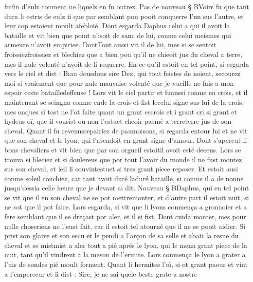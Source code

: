 \documentclass{article}
\begin{document}
\begin{pages}
      finfin d'eulz conment ne liquelz 
      en fu outrez. \pend
\pstart Pas de nouveau § BVoirs fu que tant dura li estris de eulz ii 
   que par semblant pou pooit conquerre l’un sus l’autre, et leur cop estoient moult afebloié. Dont esgarda 
   Daphus celui a qui il avoit la bataille et vit bien
   que point n’isoit de sanc de lui, conme celui meismes qui armeure n’avoit empiriee. 
   DontTout aussi vit il de lui, mes si se sentoit 
   froissiezfroissiez et blechiez que a bien pou qu’il ne chieoit jus du cheval a 
   terre, mes il nule volenté n’avoit de li requerre. En ce qu’il estoit en tel point, 
   si esgarda vers le ciel et dist :
   Biau 
      dousdous sire Dex, qui tout feistes de noient, 
      secourez moi si vraiement que pour nule mauvaise volenté que je vueille ne fais a mon espoir ceste 
      batailledeffense !
   Lors vit le ciel partir et fuaussi conme en crois, 
   et il maintenant se seingna conme ende la crois
       et fist lecelui signe sus lui 
   de la crois, mes onques si tost ne l’ot faite quant un grant escrois et 
   i grant cri si grant et hydeus oï, que il vousist ou non l’estuet 
   cheoir pasmé a terreterre jus de son cheval. \pend
\pstart Quant il fu revenusrepairiez de paumoisons, 
   si regarda entour lui et ne vit que son cheval et le lyon, qui l’atendoit en 
   grant signe d’amour. Dont s’apercut li bons chevaliers et vit bien que par son 
   orgueil estoitil avoit esté deceus. 
   Lors se trouva si bleciez et si doulereus que por tout l’avoir du monde il ne fust montez sus son cheval, et 
   leil li couvintestuet 
   si tres grant piece reposer. Et estoit ausi conme soleil couchiez, car tant avoit 
   duré laduré bataille, 
   si conme il a de nonne jusqu’dessia celle heure que 
   je devant ai dit. 
   Nouveau § BDaphus, qui en tel point se vit que il en son cheval ne 
   se pot mettremonter, 
   et d’autre part il estoit nuit, si ne sot que il pot faire. Lors esgarda, 
   si vit que li lyons conmença a gronnoier et a fere semblant que il se dreçast por aler, 
   et il si fist. Dont cuida monter, mes pour nulle choseriens ne l’eust 
   fait, car il estoit tel atourné que il ne se pooit aidier. 
   Si prist son glaive et son escu et le pendi a l’arçon de sa selle 
   et abati la resne du cheval et se 
   mistmist a aler tout a pié aprés 
   le lyon, qui le mena grant piece de la nuit, tant qu’il vindrent a 
   la meson de l’ermite. 
   Lors conmença le lyon a grater a l’uis 
   de sondes pié moult forment. 
   Quant li hermites l’oï, si ot grant paour et vint a 
   l’empereeur et li dist :
   Sire, je ne sai quele beste grate a nostre 

\end{pages}
\end{document}
